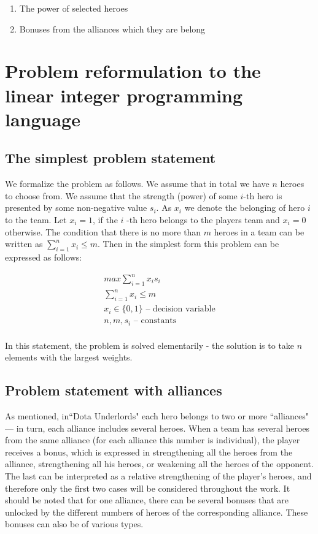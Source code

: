 \documentclass[smallextended]{svjour3}       %
\begin{document}
\begin{enumerate}
    \item The power of selected heroes
    \item Bonuses from the alliances which they are belong
\end{enumerate}


\section{Problem reformulation to the linear integer programming language }
\label{SectionDUIP}

\subsection{The simplest problem statement}

We formalize the problem as follows. We assume that in total we have $n$ heroes to choose from. We assume that the strength (power) of some $i$-th hero is presented by some non-negative value $s_i$. As $x_i$ we denote the belonging of hero $i$ to the team. Let $ x_i = 1 $, if the $ i $ -th hero belongs to the players team and $ x_i = 0 $ otherwise. The condition that there is no more than $m$ heroes in a team  can be written as $ \sum_{i=1}^n x_i \leq m $. Then in the simplest form this problem can be expressed as follows:

\begin{equation}
\begin{gathered}
    max \sum_{i=1}^n x_i s_i \\
    \sum_{i=1}^n x_i \leq m \\
    x_i \in \{0, 1\} \text{ – decision variable} \\
   n, m, s_i \text{ – constants}  \\
\end{gathered}
\end{equation}


In this statement, the problem is solved elementarily - the solution is to take $ n $ elements with the largest weights.

\subsection{Problem statement with alliances}
As mentioned, in``Dota Underlords" each hero belongs to two or more ``alliances" --- in turn, each alliance includes several heroes. When a team has several heroes from the same alliance (for each alliance this number is individual), the player receives a bonus, which is expressed in strengthening all the heroes from the alliance, strengthening all his heroes, or weakening all the heroes of the opponent. The last can be interpreted as a relative strengthening of the player’s heroes, and therefore only the first two cases will be considered throughout the work. It should be noted that for one alliance, there can be several bonuses that are unlocked by the different numbers of heroes of the corresponding alliance. These bonuses can also be of various types.
\end{document}
